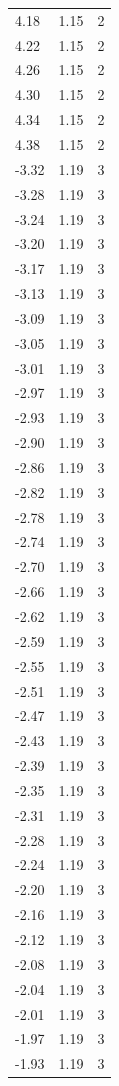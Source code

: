 \begin{longtable}{lrr}
  4.18 & 1.15 & 2 \\
  4.22 & 1.15 & 2 \\
  4.26 & 1.15 & 2 \\
  4.30 & 1.15 & 2 \\
  4.34 & 1.15 & 2 \\
  4.38 & 1.15 & 2 \\
  -3.32 & 1.19 & 3 \\
  -3.28 & 1.19 & 3 \\
  -3.24 & 1.19 & 3 \\
  -3.20 & 1.19 & 3 \\
  -3.17 & 1.19 & 3 \\
  -3.13 & 1.19 & 3 \\
  -3.09 & 1.19 & 3 \\
  -3.05 & 1.19 & 3 \\
  -3.01 & 1.19 & 3 \\
  -2.97 & 1.19 & 3 \\
  -2.93 & 1.19 & 3 \\
  -2.90 & 1.19 & 3 \\
  -2.86 & 1.19 & 3 \\
  -2.82 & 1.19 & 3 \\
  -2.78 & 1.19 & 3 \\
  -2.74 & 1.19 & 3 \\
  -2.70 & 1.19 & 3 \\
  -2.66 & 1.19 & 3 \\
  -2.62 & 1.19 & 3 \\
  -2.59 & 1.19 & 3 \\
  -2.55 & 1.19 & 3 \\
  -2.51 & 1.19 & 3 \\
  -2.47 & 1.19 & 3 \\
  -2.43 & 1.19 & 3 \\
  -2.39 & 1.19 & 3 \\
  -2.35 & 1.19 & 3 \\
  -2.31 & 1.19 & 3 \\
  -2.28 & 1.19 & 3 \\
  -2.24 & 1.19 & 3 \\
  -2.20 & 1.19 & 3 \\
  -2.16 & 1.19 & 3 \\
  -2.12 & 1.19 & 3 \\
  -2.08 & 1.19 & 3 \\
  -2.04 & 1.19 & 3 \\
  -2.01 & 1.19 & 3 \\
  -1.97 & 1.19 & 3 \\
  -1.93 & 1.19 & 3 \\

\end{longtable}
